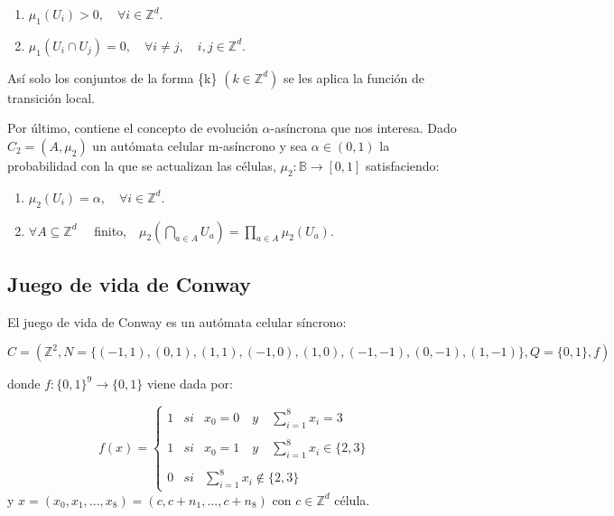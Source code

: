 \documentclass[../proyecto.tex]{memoir}
\begin{document}
\begin{enumerate}
\item $\mu_{1}(U_{i}) > 0, \quad \forall i \in \mathds{Z}^{d}$.
\item $\mu_{1}(U_{i} \cap U_{j}) = 0, \quad \forall i \neq j, \quad i,j \in \mathds{Z}^{d}$.
\end{enumerate}

Así solo los conjuntos de la forma \{k\} $(k \in \mathds{Z}^{d})$ se les aplica la función de transición local.

Por último, contiene el concepto de evolución $\alpha$-asíncrona que nos interesa. Dado $C_{2}=(A, \mu_{2})$ un autómata celular m-asíncrono y sea $\alpha \in (0,1)$ la probabilidad con la que se actualizan las células, $\mu_{2}: \mathds{B} \rightarrow [0,1]$ satisfaciendo:

\begin{enumerate}
\item $\mu_{2}(U_{i}) = \alpha, \quad \forall i \in \mathds{Z}^{d}$.
\item $ \forall A \subseteq \mathds{Z}^{d} \quad$ finito,$\quad  \mu_{2} ( \bigcap_{a \in A} U_{a} ) = \prod_{a \in A} \mu_{2} ( U_{a} )$.
\end{enumerate}


\subsection{Juego de vida de Conway}

\begin{defi}
El juego de vida de Conway es un autómata celular síncrono:

\begin{equation}
C = (\mathds{Z}^{2} , N=\{(-1, 1), (0, 1), (1, 1), (-1, 0), (1, 0), (-1,-1), (0,-1), (1,-1) \}, Q=\{0,1\}, f)
\end{equation}
 
donde $f:\{0,1\}^{9} \rightarrow \{0,1\} $ viene dada por:

\begin{equation}
f(x)= \left\{ \begin{array}{lcc}
             1 &   si  & x_{0}=0 \quad y \quad \sum_{i=1}^{8} x_i = 3 \\
             \\ 1 & si & x_{0}=1 \quad y \quad \sum_{i=1}^{8} x_i \in \{2 ,3\} \\
             \\ 0 &  si  & \sum_{i=1}^{8} x_i \notin \{2, 3\} \
             \end{array}
   \right. 
\end{equation}
y $x = (x_{0}, x_{1}, ...,x_{8}) = (c,c+n_{1},...,c+n_{8})$ con $c \in \mathds{Z} ^{d}$ célula.
\end{defi}
\end{document}
